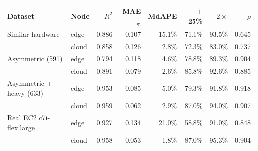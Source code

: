 \begin{tabular}{llrrrrrr}
\toprule
Dataset & Node & $R^2$ & MAE$_{\log}$ & MdAPE & $\pm$25\% & $2\times$ & $\rho$ \\
\midrule
Similar hardware & edge & 0.886 & 0.107 & 15.1\% & 71.1\% & 93.5\% & 0.645 \\
 & cloud & 0.858 & 0.126 & 2.8\% & 72.3\% & 83.0\% & 0.737 \\
\midrule
Asymmetric (591) & edge & 0.794 & 0.118 & 4.6\% & 78.8\% & 89.3\% & 0.904 \\
 & cloud & 0.891 & 0.079 & 2.6\% & 85.8\% & 92.6\% & 0.885 \\
\midrule
Asymmetric + heavy (633) & edge & 0.953 & 0.085 & 5.0\% & 79.3\% & 91.8\% & 0.918 \\
 & cloud & 0.959 & 0.062 & 2.9\% & 87.0\% & 94.0\% & 0.907 \\
\midrule
Real EC2 c7i-flex.large & edge & 0.927 & 0.134 & 21.0\% & 58.8\% & 91.0\% & 0.848 \\
 & cloud & 0.958 & 0.053 & 1.8\% & 87.0\% & 95.3\% & 0.904 \\
\bottomrule
\end{tabular}

